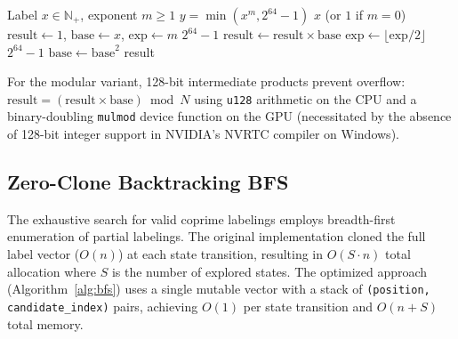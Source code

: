 \documentclass[lettersize,journal]{IEEEtran}
\begin{document}
\begin{algorithm}[!t]
\caption{Binary Exponentiation with Saturation}\label{alg:binexp}
\begin{algorithmic}
\REQUIRE Label $x \in \mathbb{N}_+$, exponent $m \geq 1$
\ENSURE $y = \min(x^m, 2^{64}-1)$
    \RETURN $x$ (or $1$ if $m = 0$)
\ENDIF
\STATE $\text{result} \leftarrow 1$, $\text{base} \leftarrow x$, $\text{exp} \leftarrow m$
            \RETURN $2^{64}-1$ 
        \ENDIF
        \STATE $\text{result} \leftarrow \text{result} \times \text{base}$
    \ENDIF
    \STATE $\text{exp} \leftarrow \lfloor\text{exp}/2\rfloor$
        \RETURN $2^{64}-1$ 
    \ENDIF
    \STATE $\text{base} \leftarrow \text{base}^2$
\ENDWHILE
\RETURN result
\end{algorithmic}
\end{algorithm}

\noindent For the modular variant, 128-bit intermediate products prevent overflow: $\text{result} = (\text{result} \times \text{base}) \bmod N$ using \texttt{u128} arithmetic on the CPU and a binary-doubling \texttt{mulmod} device function on the GPU (necessitated by the absence of 128-bit integer support in NVIDIA's NVRTC compiler on Windows).

\subsection{Zero-Clone Backtracking BFS}

The exhaustive search for valid coprime labelings employs breadth-first enumeration of partial labelings. The original implementation cloned the full label vector ($O(n)$) at each state transition, resulting in $O(S \cdot n)$ total allocation where $S$ is the number of explored states. The optimized approach (Algorithm~\ref{alg:bfs}) uses a single mutable vector with a stack of \texttt{(position, candidate\_index)} pairs, achieving $O(1)$ per state transition and $O(n + S)$ total memory.
\end{document}

